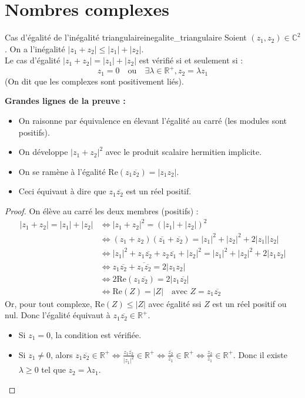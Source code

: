 \documentclass{prepacours}
\begin{document}
\section{Nombres complexes}

\begin{proposition}{Cas d'égalité de l'inégalité triangulaire}{inegalite_triangulaire}
    Soient $(z_1, z_2) \in \mathbb{C}^2$. On a l'inégalité $|z_1 + z_2| \le |z_1| + |z_2|$.
    \\
    Le cas d'égalité $|z_1 + z_2| = |z_1| + |z_2|$ est vérifié si et seulement si :
    \[ z_1 = 0 \quad \text{ou} \quad \exists \lambda \in \mathbb{R}^+, z_2 = \lambda z_1 \]
    (On dit que les complexes sont positivement liés).
\end{proposition}

\noindent \textbf{Grandes lignes de la preuve :}
\begin{itemize}
    \item On raisonne par équivalence en élevant l'égalité au carré (les modules sont positifs).
    \item On développe $|z_1+z_2|^2$ avec le produit scalaire hermitien implicite.
    \item On se ramène à l'égalité $\text{Re}(z_1\overline{z_2}) = |z_1z_2|$.
    \item Ceci équivaut à dire que $z_1\overline{z_2}$ est un réel positif.
\end{itemize}

\begin{proof}
    On élève au carré les deux membres (positifs) :
    \begin{align*}
        |z_1 + z_2| = |z_1| + |z_2| &\iff |z_1 + z_2|^2 = (|z_1| + |z_2|)^2 \\
        &\iff (z_1+z_2)(\overline{z_1}+\overline{z_2}) = |z_1|^2 + |z_2|^2 + 2|z_1||z_2| \\
        &\iff |z_1|^2 + z_1\overline{z_2} + z_2\overline{z_1} + |z_2|^2 = |z_1|^2 + |z_2|^2 + 2|z_1 z_2| \\
        &\iff z_1\overline{z_2} + \overline{z_1\overline{z_2}} = 2|z_1 z_2| \\
        &\iff 2\text{Re}(z_1\overline{z_2}) = 2|z_1\overline{z_2}| \\
        &\iff \text{Re}(Z) = |Z| \quad \text{avec } Z = z_1\overline{z_2}
    \end{align*}
    Or, pour tout complexe, $\text{Re}(Z) \le |Z|$ avec égalité ssi $Z$ est un réel positif ou nul.
    Donc l'égalité équivaut à $z_1\overline{z_2} \in \mathbb{R}^+$.
    \begin{itemize}
        \item Si $z_1 = 0$, la condition est vérifiée.
        \item Si $z_1 \neq 0$, alors $z_1\overline{z_2} \in \mathbb{R}^+ \iff \frac{z_1\overline{z_2}}{|z_1|^2} \in \mathbb{R}^+ \iff \frac{\overline{z_2}}{\overline{z_1}} \in \mathbb{R}^+ \iff \frac{z_2}{z_1} \in \mathbb{R}^+$.
        Donc il existe $\lambda \ge 0$ tel que $z_2 = \lambda z_1$.
    \end{itemize}
\end{proof}
\end{document}

